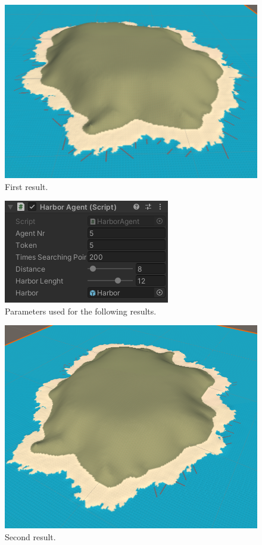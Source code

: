 \documentclass[12pt]{article}
\begin{document}
    \begin{figure}[H]
        \centering
        \includegraphics[scale = 0.3]{images/Harbor agent/1}
        \caption{First result.}
    \end{figure}

    \begin{figure}[H]
        \centering
        \includegraphics[scale = 0.8]{images/Harbor agent/Parameters 2}
        \caption{Parameters used for the following results.}
    \end{figure}

    \begin{figure}[H]
        \centering
        \includegraphics[scale = 0.3]{images/Harbor agent/2}
        \caption{Second result.}
    \end{figure}
\end{document}
